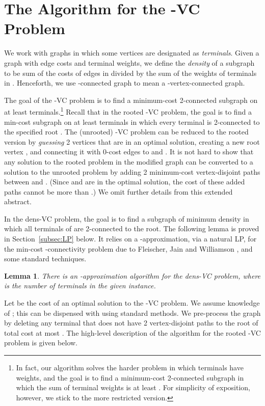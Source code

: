 \documentclass[11pt]{article}
\newtheorem{lemma}{Lemma}[section]
\newcommand{\kvc}[1]{-{\sc VC} }
\newcommand{\kv}{\kvc{2}}
\newcommand{\densV}{dens-{\sc VC} }
\begin{document}
\section{The Algorithm for the \kv Problem}\label{sec:k2vc}

We work with graphs in which some vertices are designated as
\emph{terminals}.  Given a graph  with edge costs and terminal
weights, we define the \emph{density} of a subgraph  to be sum of
the costs of edges in  divided by the sum of the weights of
terminals in .  Henceforth, we use -connected graph to mean a
-vertex-connected graph.

The goal of the \kv problem is to find a minimum-cost 2-connected
subgraph on at least  terminals.\footnote{In fact, our algorithm
  solves the harder problem in which terminals have weights, and the
  goal is to find a minimum-cost 2-connected subgraph in which the sum
  of terminal weights is at least . For simplicity of exposition,
  however, we stick to the more restricted version.}  Recall that in
the rooted \kv problem, the goal is to find a min-cost subgraph on at
least  terminals in which every terminal is 2-connected to the
specified root . The (unrooted) \kv problem can be reduced to the
rooted version by \emph{guessing} 2 vertices  that are in an
optimal solution, creating a new root vertex , and connecting it
with 0-cost edges to  and . It is not hard to show that any
solution to the rooted problem in the modified graph can be converted
to a solution to the unrooted problem by adding 2 minimum-cost
vertex-disjoint paths between  and .  (Since  and  are in
the optimal solution, the cost of these added paths cannot be more
than .) We omit further details from this extended abstract.

In the \densV problem, the goal is to find a subgraph  of minimum
density in which all terminals of  are 2-connected to the root. The
following lemma is proved in Section~\ref{subsec:LP} below.  It relies
on a -approximation, via a natural LP, for the min-cost
-connectivity problem due to Fleischer, Jain and Williamson
\cite{FleischerJW}, and some standard techniques.

\begin{lemma}\label{lem:densV}
  There is an -approximation algorithm for the \densV
  problem, where  is the number of terminals in the given
  instance.
\end{lemma}

Let  be the cost of an optimal solution to the \kv problem. We
assume knowledge of ; this can be dispensed with using standard
methods.  We pre-process the graph by deleting any terminal that does
not have 2 vertex-disjoint paths to the root  of total cost at most
. The high-level description of the algorithm for the 
rooted \kv problem is given below.
\end{document}
